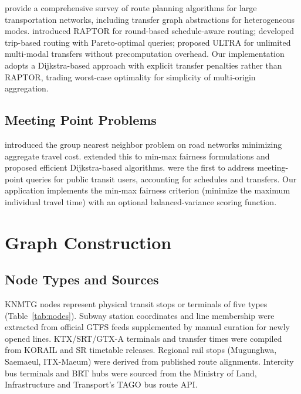 \documentclass[12pt]{article}
\begin{document}
\citet{bast2016} provide a comprehensive survey of route
planning algorithms for large transportation networks, including
transfer graph abstractions for heterogeneous modes. \citet{raptor2015}
introduced RAPTOR for round-based schedule-aware routing;
\citet{witt2015} developed trip-based routing with Pareto-optimal
queries; \citet{ultra2021} proposed ULTRA for unlimited multi-modal
transfers without precomputation overhead. Our implementation adopts a
Dijkstra-based approach with explicit transfer penalties rather than
RAPTOR, trading worst-case optimality for simplicity of multi-origin
aggregation.

\subsection{Meeting Point Problems}

\citet{papadias2004} introduced the group nearest neighbor problem on
road networks minimizing aggregate travel cost. \citet{yan2011}
extended this to min-max fairness formulations and proposed efficient
Dijkstra-based algorithms. \citet{mdm2018} were the first to address
meeting-point queries for public transit users, accounting for
schedules and transfers. Our application implements the min-max
fairness criterion (minimize the maximum individual travel time) with
an optional balanced-variance scoring function.

\section{Graph Construction}

\subsection{Node Types and Sources}

KNMTG nodes represent physical transit stops or terminals of five
types (Table~\ref{tab:nodes}). Subway station coordinates and line
membership were extracted from official GTFS feeds supplemented by
manual curation for newly opened lines. KTX/SRT/GTX-A terminals and
transfer times were compiled from KORAIL and SR timetable releases.
Regional rail stops (Mugunghwa, Saemaeul, ITX-Maeum) were derived from
published route alignments. Intercity bus terminals and BRT hubs were
sourced from the Ministry of Land, Infrastructure and Transport's TAGO
bus route API.
\end{document}
